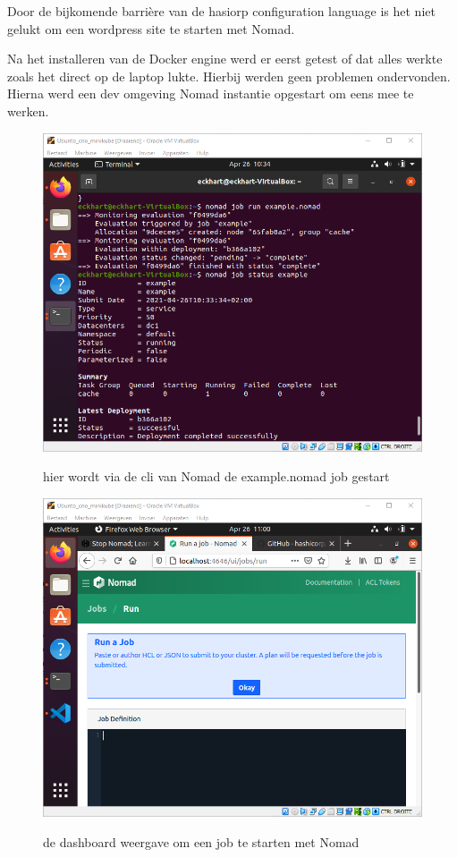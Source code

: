 Door de bijkomende barrière van de hasiorp configuration language is het niet gelukt om een wordpress site te starten met Nomad.

Na het installeren van de Docker engine werd er eerst getest of dat alles  werkte zoals het direct op de laptop lukte. Hierbij werden geen problemen ondervonden. Hierna werd een dev omgeving Nomad instantie opgestart om eens mee te werken.
\begin{figure}[h]
    \includegraphics[width=\linewidth]{img/nomadrun.png}
    \label{fig:nomadrun}
    \caption[Een voorbeeld Nomad job]{hier wordt via de cli van Nomad de example.nomad job gestart}
    \centering
\end{figure}
\begin{figure}[h]
    \includegraphics[width=\linewidth]{img/nomdaddash.png}
    \label{fig:nomdaddash}
    \caption[de nomad dashboard]{de dashboard weergave om een job te starten met Nomad}
    \centering
\end{figure}


